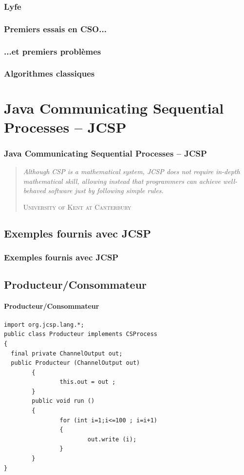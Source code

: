 \documentclass[slidetop,11pt]{beamer}
\begin{document}
\begin{frame} 
\frametitle{Lyfe}

\end{frame}

\begin{frame} 
\frametitle{Premiers essais en CSO...}

\end{frame}

\begin{frame} 
\frametitle{...et premiers problèmes}

\end{frame}

\begin{frame} 
\frametitle{Algorithmes classiques}

\end{frame}

\section{Java Communicating Sequential Processes – JCSP}
\begin{frame}
\frametitle{Java Communicating Sequential Processes – JCSP}
\begin{quotation}
\textit{\og Although CSP is a mathematical system, JCSP does not require in-depth mathematical skill, allowing instead that programmers can achieve well-behaved software just by following simple rules.\fg}
\begin{flushright}
\textsc{University of Kent at Canterbury}
\end{flushright}
\end{quotation}
\end{frame}

\subsection{Exemples fournis avec JCSP}
\begin{frame}
\frametitle{Exemples fournis avec JCSP}
\end{frame}

\subsection{Producteur/Consommateur}
\begin{frame}[containsverbatim]
\framesubtitle{Producteur/Consommateur}
\begin{lstlisting}[frame=trBL,title={Producteurs-Consommateurs: Producteur.java}]
import org.jcsp.lang.*;
public class Producteur implements CSProcess
{
  final private ChannelOutput out;
  public Producteur (ChannelOutput out)
        {
                this.out = out ;
        }
        public void run ()
        {
                for (int i=1;i<=100 ; i=i+1)
                {
                        out.write (i);
                }
        }
}
\end{lstlisting}
\end{frame}
\end{document}
